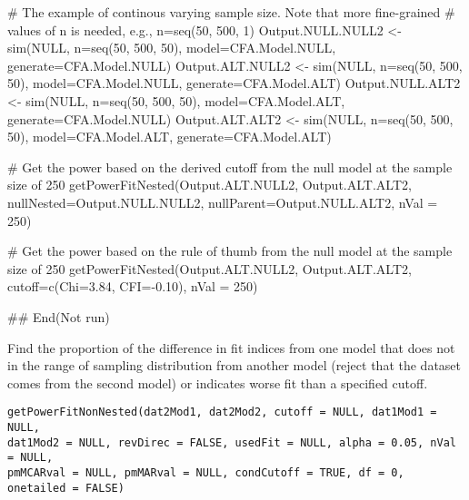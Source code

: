 \documentclass[a4paper]{book}
\begin{document}
\begin{Examples}
\begin{ExampleCode}
# The example of continous varying sample size. Note that more fine-grained 
# values of n is needed, e.g., n=seq(50, 500, 1)
Output.NULL.NULL2 <- sim(NULL, n=seq(50, 500, 50), model=CFA.Model.NULL, generate=CFA.Model.NULL) 
Output.ALT.NULL2 <- sim(NULL, n=seq(50, 500, 50), model=CFA.Model.NULL, generate=CFA.Model.ALT) 
Output.NULL.ALT2 <- sim(NULL, n=seq(50, 500, 50), model=CFA.Model.ALT, generate=CFA.Model.NULL) 
Output.ALT.ALT2 <- sim(NULL, n=seq(50, 500, 50), model=CFA.Model.ALT, generate=CFA.Model.ALT) 

# Get the power based on the derived cutoff from the null model at the sample size of 250
getPowerFitNested(Output.ALT.NULL2, Output.ALT.ALT2, nullNested=Output.NULL.NULL2, 
	nullParent=Output.NULL.ALT2, nVal = 250)

# Get the power based on the rule of thumb from the null model at the sample size of 250
getPowerFitNested(Output.ALT.NULL2, Output.ALT.ALT2, cutoff=c(Chi=3.84, CFI=-0.10), nVal = 250)

## End(Not run)
\end{ExampleCode}
\end{Examples}
%
\begin{Description}\relax
Find the proportion of the difference in fit indices from one model that does not in the range of sampling distribution from another model (reject that the dataset comes from the second model) or indicates worse fit than a specified cutoff. 
\end{Description}
%
\begin{Usage}
\begin{verbatim}
getPowerFitNonNested(dat2Mod1, dat2Mod2, cutoff = NULL, dat1Mod1 = NULL, 
dat1Mod2 = NULL, revDirec = FALSE, usedFit = NULL, alpha = 0.05, nVal = NULL, 
pmMCARval = NULL, pmMARval = NULL, condCutoff = TRUE, df = 0, onetailed = FALSE)
\end{verbatim}
\end{Usage}
%
\end{document}
